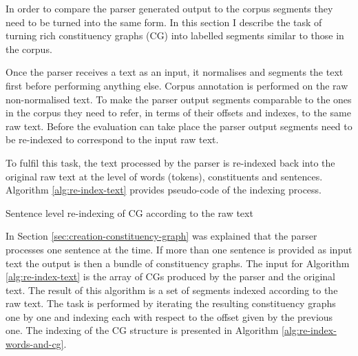     In order to compare the parser generated output to the corpus segments they need to be turned into the same form. In this section I describe the task of turning rich constituency graphs (CG) into labelled segments similar to those in the corpus. 
    
    Once the parser receives a text as an input, it normalises and segments the text first before performing anything else. Corpus annotation is performed on the raw non-normalised text. To make the parser output segments comparable to the ones in the corpus they need to refer, in terms of their offsets and indexes, to the same raw text. Before the evaluation can take place the parser output segments need to be re-indexed to correspond to the input raw text. 
    
    To fulfil this task, the text processed by the parser is re-indexed back into the original raw text at the level of words (tokens), constituents and sentences. Algorithm \ref{alg:re-index-text} provides pseudo-code of the indexing process.

    \begin{algorithm}[!ht]
        \caption{Sentence level re-indexing of CG according to the raw text}
        \label{alg:re-index-text}
    \end{algorithm}

    In Section \ref{sec:creation-constituency-graph} was explained that the parser processes one sentence at the time. If more than one sentence is provided as input text the output is then a bundle of constituency graphs. The input for Algorithm \ref{alg:re-index-text} is the array of CGs produced by the parser and the original text. The result of this algorithm is a set of segments indexed according to the raw text. The task is performed by iterating the resulting constituency graphs one by one and indexing each with respect to the offset given by the previous one. The indexing of the CG structure is presented in Algorithm \ref{alg:re-index-words-and-cg}.


